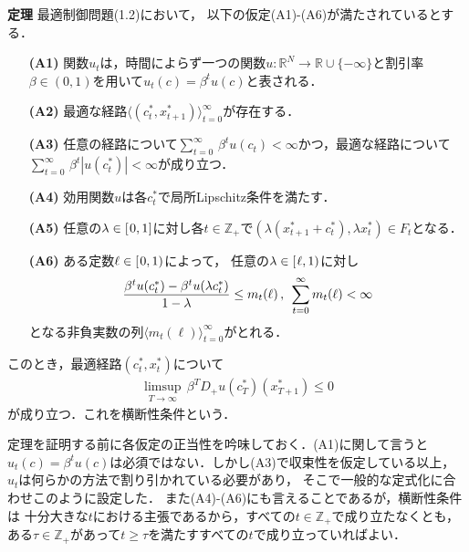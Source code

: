 \documentclass[a4paper,11pt]{jsarticle}
\DeclareRobustCommand{\lfrac}[2]{{\lower.4ex\hbox{\begingroup\ensuremath{#1}\endgroup}\over{\hspace{.2mm}#2\hspace{.2mm}}}}
\begin{document}
\noindent \textbf{定理}\hspace*{.7mm} 最適制御問題(1.2)において，
以下の仮定(A1)-(A6)が満たされているとする．
\begin{enumerate}
\item[\textbf{(A1)}] 関数$u_t$は，時間によらず一つの関数$u:\mathbb{R}^N \to \mathbb{R}\cup \{-\infty\}$と割引率$\beta \in (0,1)$を用いて$u_t(c)=\beta^t u(c)$と表される．

\item[\textbf{(A2)}] 最適な経路$\langle (c_t^*,x_{t+1}^*) \rangle_{t=0}^\infty$が存在する．

\item[\textbf{(A3)}] 任意の経路について${\textstyle \sum_{t=0}^\infty}\, \beta^t u(c_t)<\infty$かつ，最適な経路について${\textstyle \sum_{t=0}^\infty}\, \beta^t |u(c_t^*)|<\infty$が成り立つ．

\item[\textbf{(A4)}] 効用関数$u$は各$c_t^*$で局所Lipschitz条件を満たす．

\item[\textbf{(A5)}] 任意の$\lambda \in [\hspace{.3mm}0,1\hspace{.1mm}]$に対し各$t \in \mathbb{Z}_+$で$(\lambda (x_{t+1}^*+c_t^*),\lambda x_t^*)\in F_t$となる．

\item[\textbf{(A6)}] ある定数$\ell \in [\hspace{.3mm}0,1)$によって，
任意の$\lambda \in [\hspace{.3mm}\ell,1)$に対し
\begin{align*}
	\lfrac{\beta^t u(c_t^*)-\beta^t u(\lambda c_t^*)}{1-\lambda}\leq m_t(\ell)\,,\;\, \sum_{t=0}^\infty m_t(\ell)<\infty
\end{align*}
となる非負実数の列$\langle m_t (\ell)\rangle_{t=0}^\infty$がとれる．
\end{enumerate}
\noindent このとき，最適経路$(c_t^*,x_t^*)$について
\begin{align}
	\limsup_{T \to \infty}\, \beta^T D_+u(c_T^*)(x_{T+1}^*)\leq 0
\end{align}
が成り立つ．これを横断性条件という．
\vspace{7mm}

定理を証明する前に各仮定の正当性を吟味しておく．(A1)に関して言うと$u_t(c)=\beta^t u(c)$は必須ではない．しかし(A3)で収束性を仮定している以上，
$u_t$は何らかの方法で割り引かれている必要があり，
そこで一般的な定式化に合わせこのように設定した．
また(A4)-(A6)にも言えることであるが，横断性条件は
十分大きな$t$における主張であるから，すべての$t \in \mathbb{Z}_+$で成り立たなくとも，
ある$\tau \in \mathbb{Z}_+$があって$t\geq \tau$を満たすすべての$t$で成り立っていればよい．
\end{document}
